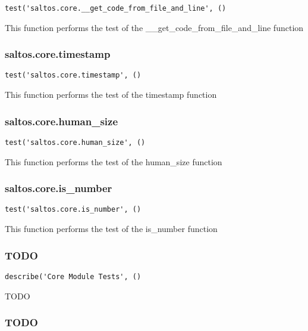 \documentclass[a4paper]{article}
\begin{document}
\begin{lstlisting}
test('saltos.core.__get_code_from_file_and_line', ()
\end{lstlisting}

This function performs the test of the \_\_get\_code\_from\_file\_and\_line function

\hypertarget{toc537}{}
\subsubsection{saltos.core.timestamp}

\begin{lstlisting}
test('saltos.core.timestamp', ()
\end{lstlisting}

This function performs the test of the timestamp function

\hypertarget{toc538}{}
\subsubsection{saltos.core.human\_size}

\begin{lstlisting}
test('saltos.core.human_size', ()
\end{lstlisting}

This function performs the test of the human\_size function

\hypertarget{toc539}{}
\subsubsection{saltos.core.is\_number}

\begin{lstlisting}
test('saltos.core.is_number', ()
\end{lstlisting}

This function performs the test of the is\_number function

\hypertarget{toc540}{}
\subsubsection{TODO}

\begin{lstlisting}
describe('Core Module Tests', ()
\end{lstlisting}

TODO

\hypertarget{toc541}{}
\subsubsection{TODO}
\end{document}
